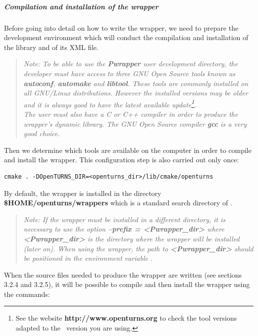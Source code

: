 \subparagraph{Compilation and installation of the wrapper}

Before going into detail on how to write the wrapper, we need to prepare the development environment which will conduct the compilation and installation of the library and of its XML file.

\small
\begin{quote}
\textit{Note: To be able to use the {\bf Pwrapper} user development directory, the developer must have access to three GNU Open Source tools known as {\bf autoconf}, {\bf automake} and {\bf libtool}. These tools are commonly installed on all GNU/Linux distributions. However the installed versions may be older and it is always good to have the latest available update\footnote{See the website {\bf http://www.openturns.org} to check the tool versions adapted to the \OT\ version you are using.}.\\
The user must also have a C or C++ compiler in order to produce the wrapper's dynamic library. The GNU Open Source compiler {\bf gcc} is a very good choice.}
\end{quote}
\normalsize

Then we determine which tools are available on the computer in order to compile and install the wrapper. This configuration step is also carried out only once:

\lstset{language=Bash, basicstyle=\normalsize}
\begin{lstlisting}[frame=TBRL]
cmake . -DOpenTURNS_DIR=<openturns_dir>/lib/cmake/openturns
\end{lstlisting}

By default, the wrapper is installed in the directory {\bf \$HOME/openturns/wrappers} which is a standard search directory of \OT.

\small
\begin{quote}
\textit{Note: If the wrapper must be installed in a different directory, it is necessary to use the option {\bf --prefix = <Pwrapper\_dir>} where {\bf <Pwrapper\_dir>} is the directory where the wrapper will be installed (later on). When using the wrapper, the path to {\bf <Pwrapper\_dir>} should be positioned in the environment variable .}
\end{quote}
\normalsize

When the source files needed to produce the wrapper are written (see sections 3.2.4 and 3.2.5), it will be possible to compile and then install the wrapper using the commands:

